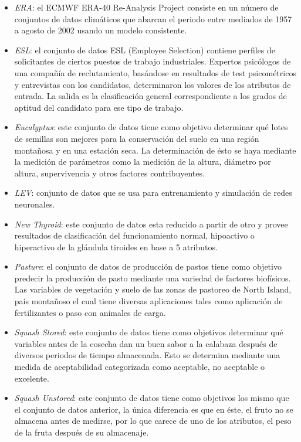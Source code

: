 \begin{itemize}
				\item \textit{ERA}: el ECMWF ERA-40 Re-Analysis Project consiste en un número de conjuntos de datos climáticos que abarcan el periodo entre mediados de 1957 a agosto de 2002 usando un modelo consistente.
				\item \textit{ESL}: el conjunto de datos ESL (Employee Selection) contiene perfiles de solicitantes de ciertos puestos de trabajo industriales. Expertos psicólogos de una compañía de reclutamiento, basándose en resultados de test psicométricos y entrevistas con los candidatos, determinaron los valores de los atributos de entrada. La salida es la clasificación general correspondiente a los grados de aptitud del candidato para ese tipo de trabajo.
				\item \textit{Eucalyptus}: este conjunto de datos tiene como objetivo determinar qué lotes de semillas son mejores para la conservación del suelo en una región montañosa y en una estación seca. La determinación de ésto se haya mediante la medición de parámetros como la medición de la altura, diámetro por altura, supervivencia y otros factores contribuyentes.
				\item \textit{LEV}: conjunto de datos que se usa para entrenamiento y simulación de redes neuronales.
				\item \textit{New Thyroid}: este conjunto de datos esta reducido a partir de otro y provee resultados de clasificación del funcionamiento normal, hipoactivo o hiperactivo de la glándula tiroides en base a 5 atributos.
				\item \textit{Pasture}: el conjunto de datos de producción de pastos tiene como objetivo predecir la producción de pasto mediante una variedad de factores biofísicos. Las variables de vegetación y suelo de las zonas de pastoreo de North Island, país montañoso el cual tiene diversas aplicaciones tales como aplicación de fertilizantes o paso con animales de carga.
				\item \textit{Squash Stored}: este conjunto de datos tiene como objetivos determinar qué variables antes de la cosecha dan un buen sabor a la calabaza después de diversos periodos de tiempo almacenada. Esto se determina mediante una medida de aceptabilidad categorizada como aceptable, no aceptable o excelente.
				\item \textit{Squash Unstored}: este conjunto de datos tiene como objetivos los mismo que el conjunto de datos anterior, la única diferencia es que en éste, el fruto no se almacena antes de medirse, por lo que carece de uno de los atributos, el peso de la fruta después de su almacenaje. 

\end{itemize}
